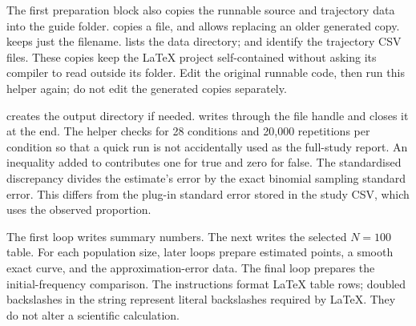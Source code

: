 The first preparation block also copies the runnable source and trajectory data into the guide folder.  copies a file, and  allows replacing an older generated copy.  keeps just the filename.  lists the data directory;  and  identify the trajectory CSV files. These copies keep the LaTeX project self-contained without asking its compiler to read outside its folder. Edit the original runnable code, then run this helper again; do not edit the generated copies separately.

 creates the output directory if needed.  writes through the file handle and closes it at the end. The helper checks for 28 conditions and 20,000 repetitions per condition so that a quick run is not accidentally used as the full-study report. An inequality added to  contributes one for true and zero for false. The standardised discrepancy divides the estimate's error by the exact binomial sampling standard error. This differs from the plug-in standard error stored in the study CSV, which uses the observed proportion.

The first loop writes summary numbers. The next writes the selected \(N=100\) table. For each population size, later loops prepare estimated points, a smooth exact curve, and the approximation-error data. The final loop prepares the initial-frequency comparison. The  instructions format LaTeX table rows; doubled backslashes in the string represent literal backslashes required by LaTeX. They do not alter a scientific calculation.


